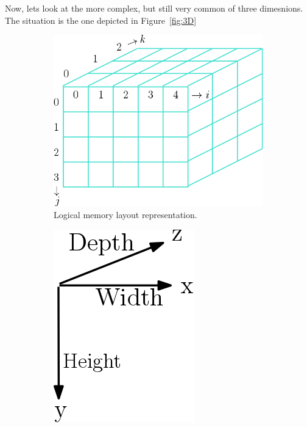 Now, lets look at the more complex, but still very common of three dimesnions. The situation is the one depicted in Figure~\ref{fig:3D}

\begin{figure}[htp]
  \centering
  \begin{subfigure}[b]{0.35\textwidth}
    \includegraphics[width=\textwidth]{img/array3D}
    \caption{Logical memory layout representation.}
  \label{fig:3a}
  \end{subfigure}
  \hspace*{4cm}
  \begin{subfigure}[b]{0.2\textwidth}
    \includegraphics[width=\textwidth]{img/arrow3D}

\end{subfigure}
\end{figure}
